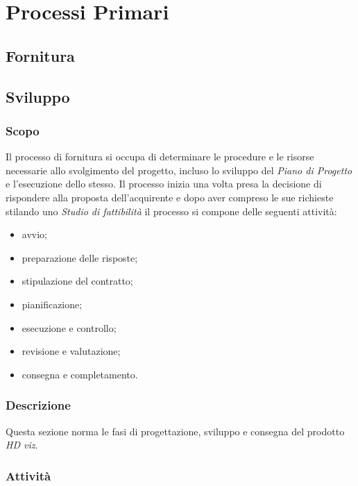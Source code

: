 \section{Processi Primari}
	\subsection{Fornitura}
	\subsection{Sviluppo}
		\subsubsection{Scopo}
		Il processo di fornitura si occupa di determinare le procedure e le risorse necessarie allo svolgimento del progetto, incluso lo sviluppo del \textit{Piano di Progetto} e l'esecuzione dello stesso. Il processo inizia una volta presa la decisione di rispondere alla proposta dell'acquirente e dopo aver compreso le sue richieste stilando uno \textit{Studio di fattibilità} il processo si compone delle seguenti attività:
		\begin{itemize}
		    \item avvio;
		    \item preparazione delle risposte;
		    \item stipulazione del contratto;
		    \item pianificazione;
		    \item esecuzione e controllo;
		    \item revisione e valutazione;
		    \item consegna e completamento.
		\end{itemize}
		\subsubsection{Descrizione}
		Questa sezione norma le fasi di progettazione, sviluppo e consegna del prodotto \textit{HD viz}. 
		\subsubsection{Attività}
